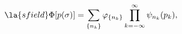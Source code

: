 \begin{equation} \la{sfield}
\Phi[p(\sigma)]
= \sum_{ \{ n_k \} } \varphi_{\{ n_k \}} \prod_{k=-\infty}^\infty
\psi_{n_k}(p_k),
\end{equation}

